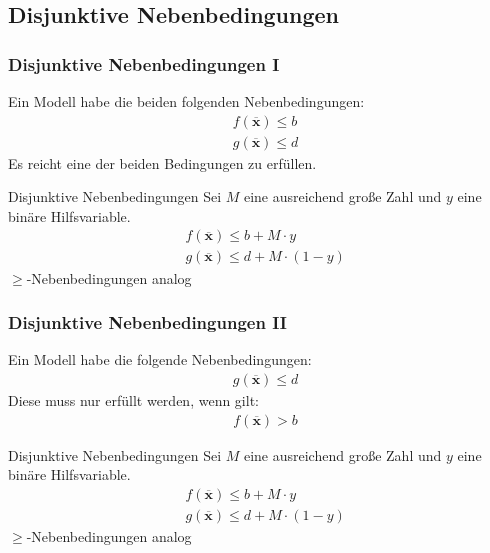 \subsection{Disjunktive Nebenbedingungen}
\begin{frame}
 \frametitle{Disjunktive Nebenbedingungen I}
 Ein Modell habe die beiden folgenden Nebenbedingungen:
 \begin{align*}
  &f(\mathbf{\overline{x}}) \leq b\\
  &g(\mathbf{\overline{x}}) \leq d
 \end{align*}
 Es reicht eine der beiden Bedingungen zu erfüllen.
 
 \begin{block}{Disjunktive Nebenbedingungen}
 Sei $M$ eine ausreichend große Zahl und $y$ eine binäre Hilfsvariable.
 \begin{align*}
  &f(\mathbf{\overline{x}}) \leq b + M\cdot y\\
  &g(\mathbf{\overline{x}}) \leq d + M\cdot (1-y)
 \end{align*}
 \footnotesize $\geq$-Nebenbedingungen analog
 \end{block}
\end{frame}

\begin{frame}
 \frametitle{Disjunktive Nebenbedingungen II}
 Ein Modell habe die folgende Nebenbedingungen:
 \begin{align*}
  &g(\mathbf{\overline{x}}) \leq d
 \end{align*}
 Diese muss nur erfüllt werden, wenn gilt:
 \begin{align*}
  &f(\mathbf{\overline{x}}) > b
 \end{align*}
 
 \begin{block}{Disjunktive Nebenbedingungen}
 Sei $M$ eine ausreichend große Zahl und $y$ eine binäre Hilfsvariable.
 \begin{align*}
  &f(\mathbf{\overline{x}}) \leq b + M\cdot y\\
  &g(\mathbf{\overline{x}}) \leq d + M\cdot (1-y)
 \end{align*}
 \footnotesize $\geq$-Nebenbedingungen analog
 \end{block}
\end{frame}
